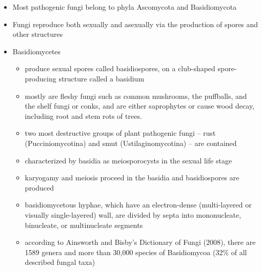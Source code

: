 \documentclass[10pt,dvipsnames,ignorenonframetext,aspectratio=169]{beamer}
\providecommand{\tightlist}{%
  \setlength{\itemsep}{0pt}\setlength{\parskip}{0pt}}
\begin{document}
\begin{frame}{}
\protect\hypertarget{section-5}{}
\begin{itemize}
\tightlist
\item
  Most pathogenic fungi belong to phyla Ascomycota and Basidiomycota
\item
  Fungi reproduce both sexually and asexually via the production of
  spores and other structures
\item
  Basidiomycetes

  \begin{itemize}
  \tightlist
  \item
    produce sexual spores called basidiospores, on a club-shaped
    spore-producing structure called a basidium
  \item
    mostly are fleshy fungi such as common mushrooms, the puffballs, and
    the shelf fungi or conks, and are either saprophytes or cause wood
    decay, including root and stem rots of trees.
  \item
    two most destructive groups of plant pathogenic fungi -- rust
    (Pucciniomycotina) and smut (Ustilaginomycotina) -- are contained
  \item
    characterized by basidia as meiosporocysts in the sexual life stage
  \item
    karyogamy and meiosis proceed in the basidia and basidiospores are
    produced
  \item
    basidiomycetous hyphae, which have an electron-dense (multi-layered
    or visually single-layered) wall, are divided by septa into
    mononucleate, binucleate, or multinucleate segments
  \item
    according to Ainsworth and Bisby's Dictionary of Fungi (2008), there
    are 1589 genera and more than 30,000 species of Basidiomycoa (32\%
    of all described fungal taxa)
  \end{itemize}
\end{itemize}
\end{frame}
\end{document}
